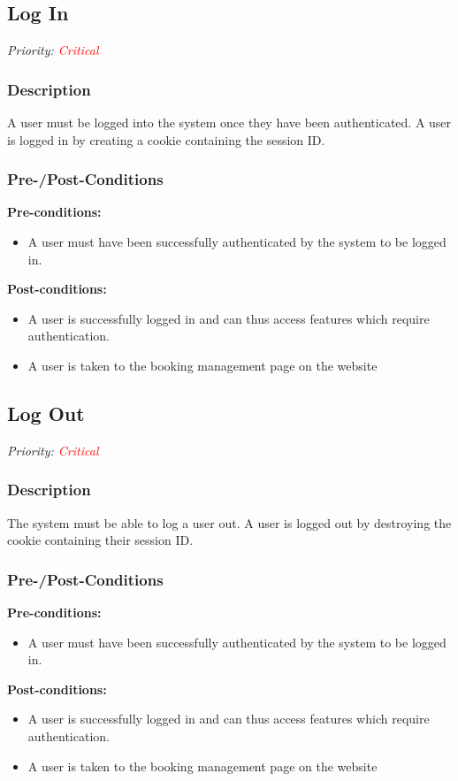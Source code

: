 \subsection{Log In}	
\textit{Priority: \textcolor{red}{Critical}} \\
\subsubsection{Description}
A user must be logged into the system once they have been authenticated. A user is logged in by creating a cookie containing the session ID. \\

\subsubsection{Pre-/Post-Conditions}
	\textbf{Pre-conditions:} 
	\begin{itemize}
		\item A user must have been successfully authenticated by the system to be logged in.
	\end{itemize}
	\textbf{Post-conditions:} 
	\begin{itemize}
		\item A user is successfully logged in and can thus access features which require authentication.
		\item A user is taken to the booking management page on the website
	\end{itemize}
	
\subsection{Log Out}	
\textit{Priority: \textcolor{red}{Critical}} \\
\subsubsection{Description}
The system must be able to log a user out. A user is logged out by destroying the cookie containing their session ID.\\

\subsubsection{Pre-/Post-Conditions}
	\textbf{Pre-conditions:} 
	\begin{itemize}
		\item A user must have been successfully authenticated by the system to be logged in.
	\end{itemize}
	\textbf{Post-conditions:} 
	\begin{itemize}
		\item A user is successfully logged in and can thus access features which require authentication.
		\item A user is taken to the booking management page on the website
	\end{itemize}

